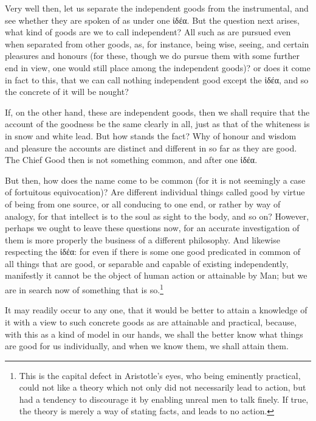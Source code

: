 Very well then, let us separate the independent goods from the instrumental,
and see whether they are spoken of as under one ἰδέα. But
the question next arises, what kind of goods are we to call independent? All
such as are pursued even when separated from other goods, as, for instance,
being wise, seeing, and certain pleasures and honours (for these, though we do
pursue them with some further end in view, one would still place among the
independent goods)? or does it come in fact to this, that we can call nothing
independent good except the ἰδέα, and so the concrete of
it will be nought?

If, on the other hand, these are independent goods, then we shall require that
the account of the goodness be the same clearly in all, just as that of the
whiteness is in snow and white lead. But how stands the fact? Why of honour and
wisdom and pleasure the accounts are distinct and different in so far as they
are good. The Chief Good then is not something common, and after one
ἰδέα.

But then, how does the name come to be common (for it is not seemingly a case
of fortuitous equivocation)? Are different individual things called good by
virtue of being from one source, or all conducing to one end, or rather by way
of analogy, for that intellect is to the soul as sight to the body, and so on?
However, perhaps we ought to leave these questions now, for an accurate
investigation of them is more properly the business of a different philosophy.
And likewise respecting the ἰδέα: for even if there is
some one good predicated in common of all things that are good, or separable
and capable of existing independently, manifestly it cannot be the object of
human action or attainable by Man; but we are in search now of something that
is so.\footnote{This is the capital defect in Aristotle’s eyes, who being eminently
practical, could not like a theory which not only did not necessarily lead to
action, but had a tendency to discourage it by enabling unreal men to talk
finely. If true, the theory is merely a way of stating facts, and leads to no
action.}

It may readily occur to any one, that it would be better to attain a knowledge
of it with a view to such concrete goods as are attainable and practical,
because, with this as a kind of model in our hands, we shall the better know
what things are good for us individually, and when we know them, we shall
attain them.

